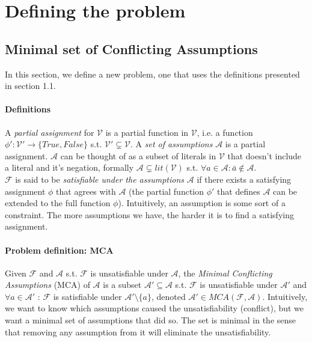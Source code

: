 \documentclass[]{article}
\begin{document}
	\pagebreak
	\section{Defining the problem}
	\subsection{Minimal set of Conflicting Assumptions}
	In this section, we define a new problem, one that uses the definitions presented in section 1.1.
	\paragraph{Definitions} A \textit{partial assignment} for $ \mathcal{V} $ is a partial function in $ \mathcal{V} $, i.e. a function $ \phi' : \mathcal{V}' \rightarrow \{True, False\} $ s.t. $\mathcal{V}' \subsetneq \mathcal{V}$. A \textit{set of assumptions} $ \mathcal{A} $ is a partial assignment. $ \mathcal{A} $ can be thought of as a subset of literals in $\mathcal{V}$ that doesn't include a literal and it's negation, formally $ \mathcal{A} \subsetneq lit(\mathcal{V}) $ s.t. $ \forall a \in \mathcal{A} : \bar{a} \notin \mathcal{A} $.\\
	$ \mathcal{F} $ is said to be \textit{satisfiable under the assumptions} $ \mathcal{A} $ if there exists a satisfying assignment $ \phi $ that agrees with $ \mathcal{A} $ (the partial function $ \phi' $ that defines $ \mathcal{A} $ can be extended to the full function $ \phi $). Intuitively, an assumption is some sort of a constraint. The more assumptions we have, the harder it is to find a satisfying assignment.
	\paragraph{Problem definition: MCA} Given $ \mathcal{F} $ and $ \mathcal{A} $ s.t. $ \mathcal{F} $ is unsatisfiable under $ \mathcal{A} $, the \textit{Minimal Conflicting Assumptions} (MCA) of $ \mathcal{A} $ is a subset $ \mathcal{A}' \subseteq \mathcal{A} $ s.t. $ \mathcal{F} $ is unsatisfiable under $ \mathcal{A}' $ and $ \forall a \in \mathcal{A}' $ : $ \mathcal{F} $ is satisfiable under $ \mathcal{A}' \setminus \{a\} $, denoted $ \mathcal{A}' \in MCA(\mathcal{F},\mathcal{A}) $. Intuitively, we want to know which assumptions caused the unsatisfiability (conflict), but we want a minimal set of assumptions that did so. The set is minimal in the sense that removing any assumption from it will eliminate the unsatisfiability.\\
\end{document}
